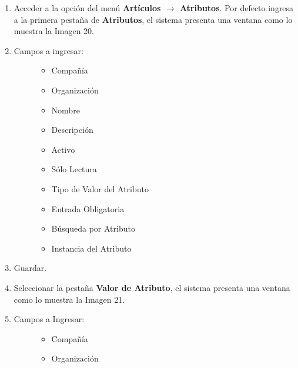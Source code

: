 \documentclass[letterpaper,10pt,spanish]{sphinxmanual}
\begin{document}
\begin{enumerate}
\item {} 
Acceder a la opción del menú \textbf{Artículos \(\rightarrow\) Atributos}. Por defecto ingresa a la primera pestaña de \textbf{Atributos}, el sistema presenta una ventana como lo muestra la Imagen 20.

\item {} \begin{description}
\item[{Campos a ingresar:}] \leavevmode\begin{itemize}
\item {} 
Compañía

\item {} 
Organización

\item {} 
Nombre

\item {} 
Descripción

\item {} 
Activo

\item {} 
Sólo Lectura

\item {} 
Tipo de Valor del Atributo

\item {} 
Entrada Obligatoria

\item {} 
Búsqueda por Atributo

\item {} 
Instancia del Atributo

\end{itemize}

\end{description}

\item {} 
Guardar.

\item {} 
Seleccionar la pestaña \textbf{Valor de Atributo}, el sistema presenta una ventana como lo muestra la Imagen 21.

\item {} \begin{description}
\item[{Campos a Ingresar:}] \leavevmode\begin{itemize}
\item {} 
Compañía

\item {} 
Organización


\end{itemize}
\end{description}
\end{enumerate}
\end{document}
